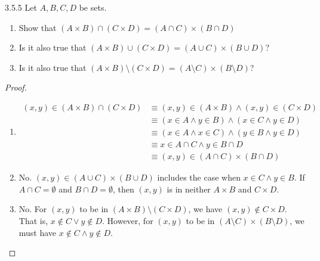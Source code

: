 \begin{exercise}{3.5.5}
	Let $A,B,C,D$ be sets.
	\begin{enumerate}
		\item Show that $(A \times B) \cap (C \times D) = (A \cap C) \times (B \cap D)$		
		\item Is it also true that $(A \times B) \cup (C \times D) = (A \cup C) \times (B \cup D)$?
		\item Is it also true that $(A \times B) \setminus (C \times D) = (A \setminus C) \times (B \setminus D)$?
	\end{enumerate}
\end{exercise}
\begin{proof}\leavevmode
	\begin{enumerate}
		\item 
		\begin{align*}
			(x,y) \in (A \times B) \cap (C \times D) 
			&\equiv (x,y) \in (A \times B) \wedge (x,y) \in (C \times D) \\
			&\equiv (x \in A \wedge y \in B) \wedge (x \in C \wedge y \in D) \\
			&\equiv (x \in A \wedge x \in C) \wedge (y \in B \wedge y \in D) \\
			&\equiv x \in A \cap C \wedge y \in B \cap D \\
			&\equiv (x,y) \in (A \cap C) \times (B \cap D)
		\end{align*}
	
		\item No. $(x,y) \in (A \cup C) \times (B \cup D)$ includes the case when $x \in C \wedge y \in B$. If $A \cap C = \emptyset$ and $B \cap D = \emptyset$, then $(x,y)$ is in neither $A \times B$ and $C \times D$.
		
		\item No. For $(x,y)$ to be in $(A \times B) \setminus (C \times D)$, we have $(x,y) \notin C \times D$. That is, $x \notin C \vee y \notin D$. However, for $(x,y)$ to be in $(A \setminus C) \times (B \setminus D)$, we must have $x \notin C \wedge y \notin D$.
	\end{enumerate}
\end{proof}


